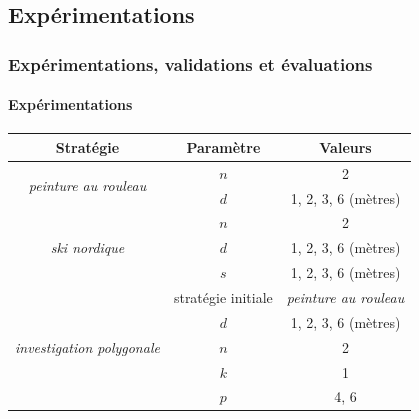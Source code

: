 \documentclass{beamer}
\begin{document}
		\subsection{Expérimentations}
			\begin{frame}
				\frametitle{Expérimentations, validations et évaluations}
				\framesubtitle{Expérimentations}
				\begin{table}[H]
					\centering
					\begin{tabular}{|c|c|c|}
						\hline
						Stratégie & Paramètre & Valeurs \\
						\hline
						\multirow{2}{*}{\textit{peinture au rouleau}} & $n$ & 2 \\
						& $d$ & 1, 2, 3, 6 (mètres) \\
						\hline
						\multirow{3}{*}{\textit{ski nordique}} & $n$ & 2 \\
						& $d$ & 1, 2, 3, 6 (mètres) \\
						& $s$ & 1, 2, 3, 6 (mètres) \\
						\hline
						\multirow{5}{*}{\textit{investigation polygonale}} & stratégie initiale & \textit{peinture au rouleau} \\
						& $d$ & 1, 2, 3, 6 (mètres) \\
						& $n$ & 2 \\
						& $k$ & 1 \\
						& $p$ & 4, 6 \\
						\hline
					\end{tabular}
				\end{table}
			\end{frame}
\end{document}
